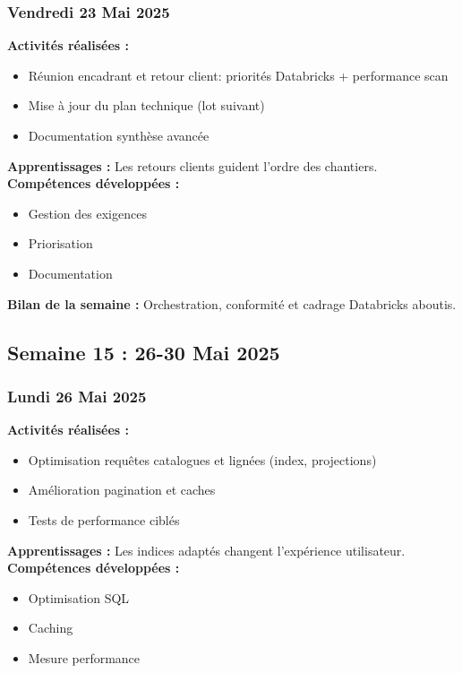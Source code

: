 \documentclass[12pt,a4paper]{article}
\begin{document}
\subsubsection{Vendredi 23 Mai 2025}
\textbf{Activités réalisées :}
\begin{itemize}
    \item Réunion encadrant et retour client: priorités Databricks + performance scan
    \item Mise à jour du plan technique (lot suivant)
    \item Documentation synthèse avancée
\end{itemize}
\textbf{Apprentissages :} Les retours clients guident l'ordre des chantiers.
\textbf{Compétences développées :}
\begin{itemize}
    \item Gestion des exigences
    \item Priorisation
    \item Documentation
\end{itemize}
\textbf{Bilan de la semaine :} Orchestration, conformité et cadrage Databricks aboutis.

\clearpage
\subsection{Semaine 15 : 26-30 Mai 2025}

\subsubsection{Lundi 26 Mai 2025}
\textbf{Activités réalisées :}
\begin{itemize}
    \item Optimisation requêtes catalogues et lignées (index, projections)
    \item Amélioration pagination et caches
    \item Tests de performance ciblés
\end{itemize}
\textbf{Apprentissages :} Les indices adaptés changent l'expérience utilisateur.
\textbf{Compétences développées :}
\begin{itemize}
    \item Optimisation SQL
    \item Caching
    \item Mesure performance
\end{itemize}
\end{document}
